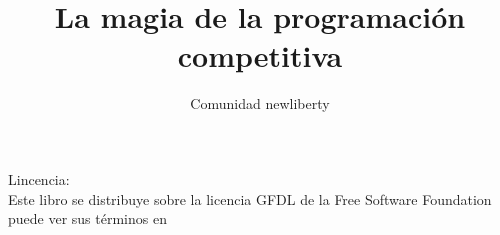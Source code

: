 \documentclass[11pt,a4paper]{book}
\author{Comunidad newliberty}
\title{La magia de la programación competitiva}
\begin{document}


\maketitle
\tableofcontents
\cleardoublepage
{}
\listoffigures
\cleardoublepage
{}
\listoftables
\cleardoublepage

\noindent Lincencia:\\

Este libro se distribuye sobre la licencia GFDL de la Free Software Foundation puede ver sus términos en \cite{GFDL:Online}







\cleardoublepage
{}

\end{document}
